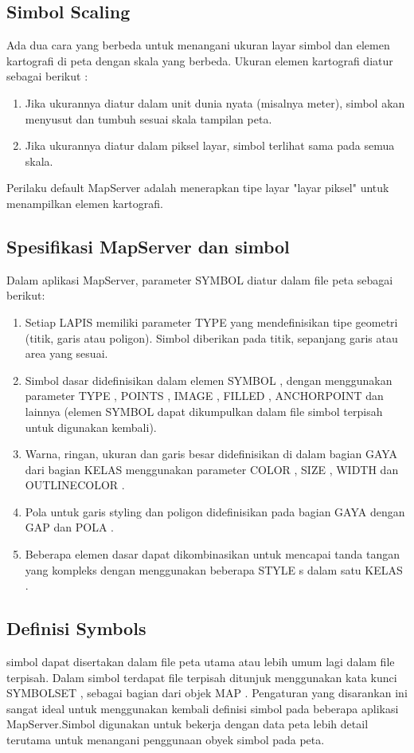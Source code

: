 \subsection {Simbol Scaling}
Ada dua cara yang berbeda untuk menangani ukuran layar simbol dan elemen kartografi di peta dengan skala yang berbeda. Ukuran elemen kartografi diatur sebagai berikut :
\begin{enumerate}
\item Jika ukurannya diatur dalam unit dunia nyata (misalnya meter), simbol akan menyusut dan tumbuh sesuai skala tampilan peta.
\item Jika ukurannya diatur dalam piksel layar, simbol terlihat sama pada semua skala.
\end{enumerate}

Perilaku default MapServer adalah menerapkan tipe layar "layar piksel" untuk menampilkan elemen kartografi.

\subsection {Spesifikasi MapServer dan simbol}
Dalam aplikasi MapServer, parameter SYMBOL diatur dalam file peta sebagai berikut:
\begin{enumerate}
\item Setiap LAPIS memiliki parameter TYPE yang mendefinisikan tipe geometri (titik, garis atau poligon). Simbol diberikan pada titik, sepanjang garis atau area yang sesuai.
\item Simbol dasar didefinisikan dalam elemen SYMBOL , dengan menggunakan parameter TYPE , POINTS , IMAGE , FILLED , ANCHORPOINT dan lainnya (elemen SYMBOL dapat dikumpulkan dalam file simbol terpisah untuk digunakan kembali).
\item Warna, ringan, ukuran dan garis besar didefinisikan di dalam bagian GAYA dari bagian KELAS menggunakan parameter COLOR , SIZE , WIDTH dan OUTLINECOLOR .
\item Pola untuk garis styling dan poligon didefinisikan pada bagian GAYA dengan GAP dan POLA .
\item Beberapa elemen dasar dapat dikombinasikan untuk mencapai tanda tangan yang kompleks dengan menggunakan beberapa STYLE s dalam satu KELAS .
\end{enumerate}

\subsection {Definisi Symbols}
    simbol dapat disertakan dalam file peta utama atau lebih umum lagi dalam file terpisah. Dalam simbol terdapat file terpisah ditunjuk menggunakan kata kunci SYMBOLSET , sebagai bagian dari objek MAP . Pengaturan yang disarankan ini sangat ideal untuk menggunakan kembali definisi simbol pada beberapa aplikasi MapServer.Simbol digunakan untuk bekerja dengan data peta lebih detail terutama untuk menangani penggunaan obyek simbol pada peta.

